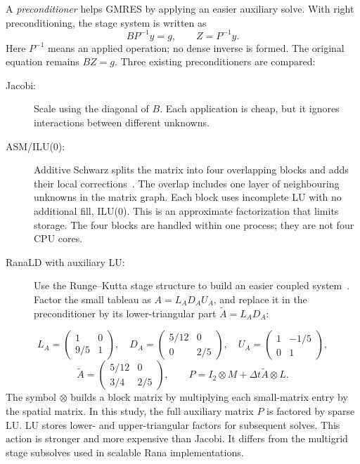 \documentclass[11pt,a4paper]{article}
\begin{document}
A \emph{preconditioner} helps GMRES by applying an easier auxiliary solve. With right preconditioning, the stage system is written as
\begin{equation}
BP^{-1}y=g,\qquad Z=P^{-1}y.
\end{equation}
Here $P^{-1}$ means an applied operation; no dense inverse is formed. The original equation remains $BZ=g$. Three existing preconditioners are compared:
\begin{description}
\item[Jacobi:] Scale using the diagonal of $B$. Each application is cheap, but it ignores interactions between different unknowns.
\item[ASM/ILU(0):] Additive Schwarz splits the matrix into four overlapping blocks and adds their local corrections~\cite{petscasm}. The overlap includes one layer of neighbouring unknowns in the matrix graph. Each block uses incomplete LU with no additional fill, ILU(0). This is an approximate factorization that limits storage. The four blocks are handled within one process; they are not four CPU cores.
\item[RanaLD with auxiliary LU:] Use the Runge--Kutta stage structure to build an easier coupled system~\cite{rana,ranademo}. Factor the small tableau as $A=L_A D_A U_A$, and replace it in the preconditioner by its lower-triangular part $\widetilde A=L_A D_A$:
\end{description}
\begin{equation}
L_A=\begin{pmatrix}1&0\\9/5&1\end{pmatrix},\quad
D_A=\begin{pmatrix}5/12&0\\0&2/5\end{pmatrix},\quad
U_A=\begin{pmatrix}1&-1/5\\0&1\end{pmatrix},
\end{equation}
\begin{equation}
\widetilde A=\begin{pmatrix}5/12&0\\3/4&2/5\end{pmatrix},\qquad
P=I_2\otimes M+\Delta t\widetilde A\otimes L.
\end{equation}
The symbol $\otimes$ builds a block matrix by multiplying each small-matrix entry by the spatial matrix. In this study, the full auxiliary matrix $P$ is factored by sparse LU. LU stores lower- and upper-triangular factors for subsequent solves. This action is stronger and more expensive than Jacobi. It differs from the multigrid stage subsolves used in scalable Rana implementations.
\end{document}

